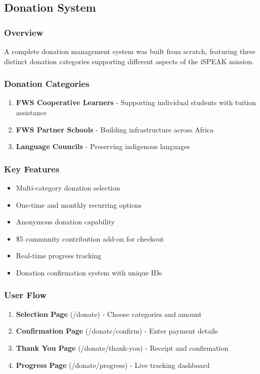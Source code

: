 \documentclass[11pt,a4paper]{article}
\begin{document}
\subsection{Donation System}
\subsubsection{Overview}
A complete donation management system was built from scratch, featuring three distinct donation categories supporting different aspects of the iSPEAK mission.

\subsubsection{Donation Categories}
\begin{enumerate}[leftmargin=*]
    \item \textbf{FWS Cooperative Learners} - Supporting individual students with tuition assistance
    \item \textbf{FWS Partner Schools} - Building infrastructure across Africa
    \item \textbf{Language Councils} - Preserving indigenous languages
\end{enumerate}

\subsubsection{Key Features}
\begin{itemize}[leftmargin=*,itemsep=3pt]
    \item Multi-category donation selection
    \item One-time and monthly recurring options
    \item Anonymous donation capability
    \item \$5 community contribution add-on for checkout
    \item Real-time progress tracking
    \item Donation confirmation system with unique IDs
\end{itemize}

\subsubsection{User Flow}
\begin{enumerate}[leftmargin=*]
    \item \textbf{Selection Page} (/donate) - Choose categories and amount
    \item \textbf{Confirmation Page} (/donate/confirm) - Enter payment details
    \item \textbf{Thank You Page} (/donate/thank-you) - Receipt and confirmation
    \item \textbf{Progress Page} (/donate/progress) - Live tracking dashboard
\end{enumerate}
\end{document}
